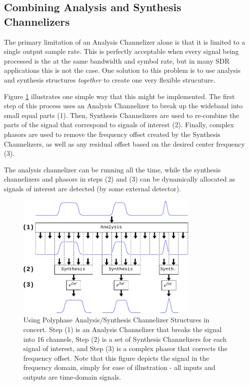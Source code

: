 \documentclass[12pt]{report}
\begin{document}
\subsection{Combining Analysis and Synthesis Channelizers}
The primary limitation of an Analysis Channelizer alone is that it is limited
to a single output sample rate. This is perfectly acceptable when every signal
being processed is the at the same bandwidth and symbol rate, but in many SDR
applications this is not the case. One solution to this problem is to use
analysis and synthesis structures \emph{together} to create one very flexible
strucuture.

Figure \ref{fig:analysis_and_synthesis} illustrates one simple way that this
might be implemented. The first step of this process uses an Analysis
Channelizer to break up the wideband into small equal parts (1). Then,
Synthesis Channelizers are used to re-combine the parts of the signal that
correspond to signals of interest (2). Finally, complex phasors are used to
remove the frequency offset created by the Synthesis Channelizers, as well as
any residual offset based on the desired center frequency (3).

The analysis channelizer can be running all the time, while the synthesis
channelizers and phasors in steps (2) and (3) can be dynamically allocated as
signals of interest are detected (by some external detector).

\begin{figure}[h!]
    \begin{center}
    \includegraphics[width=0.8\textwidth]{polyphase}%
    \end{center}
    \caption{
Using Polyphase Analysis/Synthesis Channelizer Structures in concert. Step (1)
is an Analysis Channelizer that breaks the signal into 16 channels, Step (2) is
a set of Synthesis Channelizers for each signal of interest, and Step (3) is
a complex phasor that corrects the frequency offset. Note that this figure
depicts the signal in the frequency domain, simply for ease of illustration -
all inputs and outputs are time-domain signals.
    }
    \label{fig:analysis_and_synthesis}
\end{figure}
\end{document}
